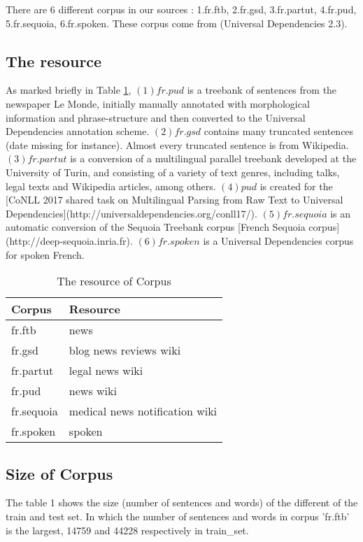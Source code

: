 \documentclass{article}
\begin{document}
There are 6 different corpus in our sources : 1.fr.ftb, 2.fr.gsd, 3.fr.partut, 4.fr.pud, 5.fr.sequoia, 6.fr.spoken. These corpus come from (Universal Dependencies 2.3). 

\subsection{The resource}
As marked briefly in Table \ref{table_resource}, $(1) fr.pud$  is a treebank of sentences from the newspaper Le Monde, initially manually annotated with morphological information and phrase-structure and then converted to the Universal Dependencies annotation scheme. $(2) fr.gsd$ contains many truncated sentences (date missing for instance). Almost every truncated sentence is from Wikipedia. $(3) fr.partut$ is a conversion of a multilingual parallel treebank developed at the University of Turin, and consisting of a variety of text genres, including talks, legal texts and Wikipedia articles, among others. $(4) pud$ is created for the [CoNLL 2017 shared task on Multilingual Parsing from Raw Text to Universal Dependencies](http://universaldependencies.org/conll17/). $(5) fr.sequoia$ is an automatic conversion of the Sequoia Treebank corpus [French Sequoia corpus](http://deep-sequoia.inria.fr). $(6) fr.spoken$ is a Universal Dependencies corpus for spoken French.

\begin{table}[h]
\caption{The resource of Corpus}
\vspace{5pt}
\centering
    
\begin{tabular}{|l|l|}
\hline
Corpus & Resource\\
\hline
fr.ftb     & news \\
fr.gsd     & blog news reviews wiki\\
fr.partut  & legal news wiki\\
fr.pud     & news wiki\\
fr.sequoia & medical news notification wiki\\
fr.spoken  & spoken \\
\hline
\end{tabular}
\label{table_resource}
\end{table}


\subsection{Size of Corpus} 
The table 1 shows the size (number of sentences and words) of the different of the train and test set. In which the number of sentences and words in corpus 'fr.ftb' is the largest, 14759 and 44228 respectively in train\_set. 
\end{document}
